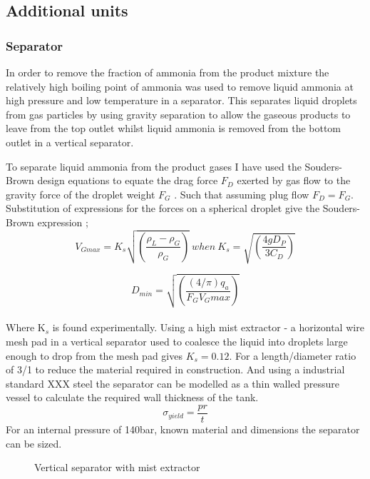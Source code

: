{\subsection{Additional units}

\subsubsection{Separator}
In order to remove the fraction of ammonia from the product mixture the relatively high boiling point of ammonia was used to remove liquid ammonia at high pressure and low temperature in a separator. This separates liquid droplets from gas particles by using gravity separation to allow the gaseous products to leave from the top outlet whilst liquid ammonia is removed from the bottom outlet in a vertical separator.

To separate liquid ammonia from the product gases I have used the Souders-Brown design equations to equate the drag force $F_D$ exerted by gas flow to the gravity force of the droplet weight $F_G$ \cite{Campbell2015} \cite{Jekel2001}. Such that assuming plug flow $F_D = F_G$. Substitution of expressions for the forces on a spherical droplet give the Souders-Brown expression \cite{Souders1934};
\begin{equation} V_{Gmax}=K_s\sqrt{ \left ( \frac{\rho_L - \rho_G}{\rho_G} \right )}\  when \  K_s = \sqrt{ \left ( \frac{4gD_P}{3C_D} \right )} \end{equation}

\begin{equation}D_{min} = \sqrt{\left ( \frac{(4/\pi)q_a}{F_GV_Gmax} \right ) } \end{equation}
\\ 
Where K$_s$ is found experimentally. Using a high mist extractor - a horizontal wire mesh pad in a vertical separator used to coalesce the liquid into droplets large enough to drop from the mesh pad gives $K_s = 0.12$. For a length/diameter ratio of 3/1 to reduce the material required in construction. And using a industrial standard XXX steel the separator can be modelled as a thin walled pressure vessel to calculate the required wall thickness of the tank.
\begin{equation}
	\sigma_{yield}=\frac{pr}{t}
\end{equation}
For an internal pressure of 140bar, known material and dimensions the separator can be sized.

{\begin{figure}[h]
		\caption{Vertical separator with mist extractor}
		

\end{figure}}}
